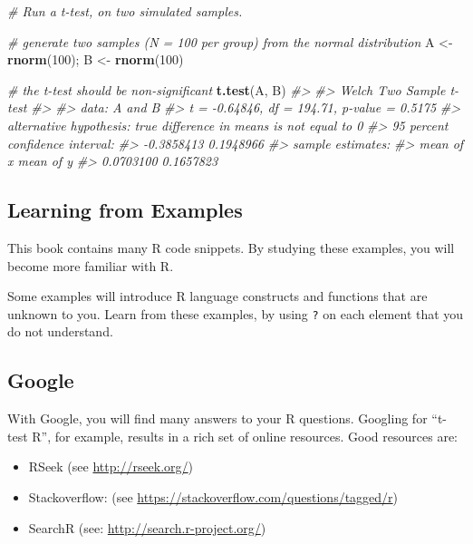 \documentclass[]{book}
\newenvironment{Shaded}{\begin{snugshade}}{\end{snugshade}}
\newcommand{\KeywordTok}[1]{\textcolor[rgb]{0.13,0.29,0.53}{\textbf{#1}}}
\newcommand{\DecValTok}[1]{\textcolor[rgb]{0.00,0.00,0.81}{#1}}
\newcommand{\StringTok}[1]{\textcolor[rgb]{0.31,0.60,0.02}{#1}}
\newcommand{\CommentTok}[1]{\textcolor[rgb]{0.56,0.35,0.01}{\textit{#1}}}
\newcommand{\NormalTok}[1]{#1}
\begin{document}
\begin{Shaded}
\begin{Highlighting}[]
\CommentTok{# Run a t-test, on two simulated samples.}

\CommentTok{# generate two samples (N = 100 per group) from the normal distribution}
\NormalTok{A <-}\StringTok{ }\KeywordTok{rnorm}\NormalTok{(}\DecValTok{100}\NormalTok{); B <-}\StringTok{ }\KeywordTok{rnorm}\NormalTok{(}\DecValTok{100}\NormalTok{)}

\CommentTok{# the t-test should be non-significant }
\KeywordTok{t.test}\NormalTok{(A, B)}
\CommentTok{#> }
\CommentTok{#>  Welch Two Sample t-test}
\CommentTok{#> }
\CommentTok{#> data:  A and B}
\CommentTok{#> t = -0.64846, df = 194.71, p-value = 0.5175}
\CommentTok{#> alternative hypothesis: true difference in means is not equal to 0}
\CommentTok{#> 95 percent confidence interval:}
\CommentTok{#>  -0.3858413  0.1948966}
\CommentTok{#> sample estimates:}
\CommentTok{#> mean of x mean of y }
\CommentTok{#> 0.0703100 0.1657823}
\end{Highlighting}
\end{Shaded}

\subsection{Learning from Examples}\label{learning-from-examples}

This book contains many R code snippets. By studying these examples, you
will become more familiar with R.

Some examples will introduce R language constructs and functions that
are unknown to you. Learn from these examples, by using \texttt{?} on
each element that you do not understand.

\subsection{Google}\label{google}

With Google, you will find many answers to your R questions. Googling
for ``t-test R'', for example, results in a rich set of online
resources. Good resources are:

\begin{itemize}
\item
  RSeek (see \url{http://rseek.org/})
\item
  Stackoverflow: (see
  \url{https://stackoverflow.com/questions/tagged/r})
\item
  SearchR (see: \url{http://search.r-project.org/})
\end{itemize}
\end{document}
